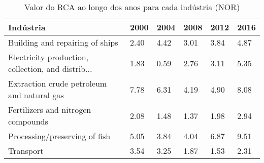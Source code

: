\begin{table}
\centering
\caption{Valor do RCA ao longo dos anos para cada indústria (NOR)}
\begin{tabular}{p{6cm}p{1.5cm}p{1.5cm}p{1.5cm}p{1.5cm}p{1.5cm}}
\toprule
                                         Indústria & 2000 & 2004 & 2008 & 2012 & 2016 \\
\midrule
                   Building and repairing of ships & 2.40 & 4.42 & 3.01 & 3.84 & 4.87 \\
Electricity production, collection, and distrib... & 1.83 & 0.59 & 2.76 & 3.11 & 5.35 \\
        Extraction crude petroleum and natural gas & 7.78 & 6.31 & 4.19 & 4.90 & 8.08 \\
                Fertilizers and nitrogen compounds & 2.08 & 1.48 & 1.37 & 1.98 & 2.94 \\
                     Processing/preserving of fish & 5.05 & 3.84 & 4.04 & 6.87 & 9.51 \\
                                         Transport & 3.54 & 3.25 & 1.87 & 1.53 & 2.31 \\
\bottomrule
\end{tabular}
\end{table}
